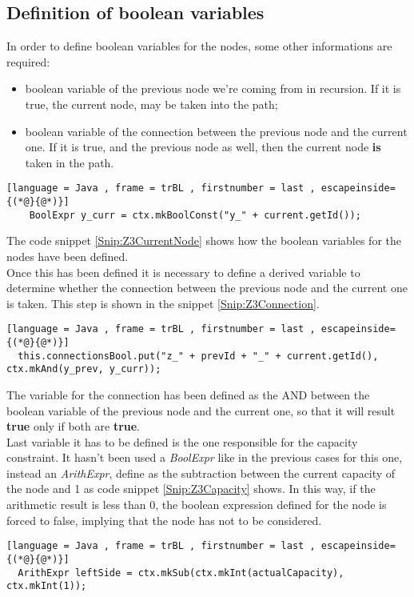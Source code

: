 \subsection{Definition of boolean variables}
In order to define boolean variables for the nodes, some other informations are required:
\begin{itemize}
  \item boolean variable of the previous node we're coming from in recursion. If it is true, the current node, may be taken into the path;
  \item boolean variable of the connection between the previous node and the current one. If it is true, and the previous node as well, then the current node \textbf{is} taken in the path.
\end{itemize}
\begin{lstlisting}[language = Java , frame = trBL , firstnumber = last , escapeinside={(*@}{@*)}]
	BoolExpr y_curr = ctx.mkBoolConst("y_" + current.getId());
\end{lstlisting}\label{Snip:Z3CurrentNode}
The code snippet \ref{Snip:Z3CurrentNode} shows how the boolean variables for the nodes have been defined.\\
Once this has been defined it is necessary to define a derived variable to determine whether the connection between the previous node and the current one is taken. This step is shown in the snippet \ref{Snip:Z3Connection}.
\begin{lstlisting}[language = Java , frame = trBL , firstnumber = last , escapeinside={(*@}{@*)}]
  this.connectionsBool.put("z_" + prevId + "_" + current.getId(), ctx.mkAnd(y_prev, y_curr));
\end{lstlisting}\label{Snip:Z3Connection}
The variable for the connection has been defined as the AND between the boolean variable of the previous node and the current one, so that it will result \textbf{true} only if both are \textbf{true}.\\
Last variable it has to be defined is the one responsible for the capacity constraint. It hasn't been used a \textit{BoolExpr} like in the previous cases for this one, instead an \textit{ArithExpr}, define as the subtraction between the current capacity of the node and 1 as code snippet \ref{Snip:Z3Capacity} shows. In this way, if the arithmetic result is less than 0, the boolean expression defined for the node is forced to false, implying that the node has not to be considered.
\begin{lstlisting}[language = Java , frame = trBL , firstnumber = last , escapeinside={(*@}{@*)}]
  ArithExpr leftSide = ctx.mkSub(ctx.mkInt(actualCapacity), ctx.mkInt(1));
\end{lstlisting}\label{Snip:Z3Capacity}


